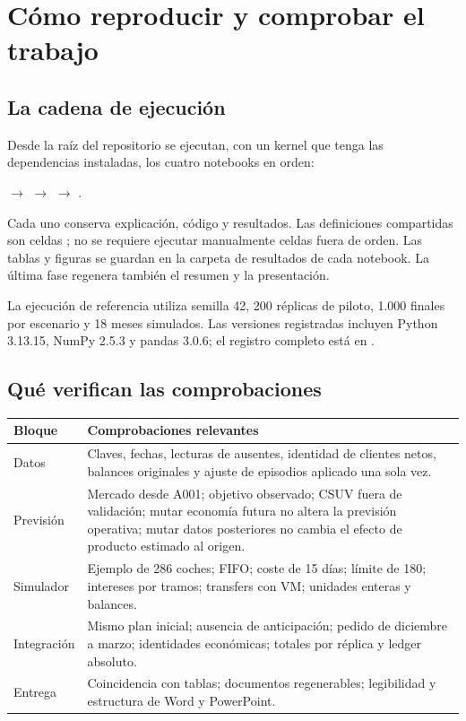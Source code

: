 \section{Cómo reproducir y comprobar el trabajo}\label{anexo:reproducir}

\subsection{La cadena de ejecución}
Desde la raíz del repositorio se ejecutan, con un kernel que tenga las dependencias
instaladas, los cuatro notebooks en orden:
\begin{center}
 $\longrightarrow$ 
$\longrightarrow$ 
$\longrightarrow$ .
\end{center}
Cada uno conserva explicación, código y resultados. Las definiciones compartidas
son celdas ; no se requiere ejecutar manualmente celdas fuera de orden.
Las tablas y figuras se guardan en la carpeta de resultados de cada notebook.
La última fase regenera también el resumen y la presentación.

La ejecución de referencia utiliza semilla 42, 200 réplicas de piloto, 1.000
finales por escenario y 18 meses simulados. Las versiones registradas incluyen
Python 3.13.15, NumPy 2.5.3 y pandas 3.0.6; el registro completo está en
.

\subsection{Qué verifican las comprobaciones}
\noindent\begin{tabularx}{\linewidth}{@{}p{3.1cm}Y@{}}\toprule
Bloque & Comprobaciones relevantes \\\midrule
Datos & Claves, fechas, lecturas de ausentes, identidad de clientes netos,
balances originales y ajuste de episodios aplicado una sola vez.\\
Previsión & Mercado desde A001; objetivo observado; CSUV fuera de validación;
mutar economía futura no altera la previsión operativa; mutar datos posteriores
no cambia el efecto de producto estimado al origen.\\
Simulador & Ejemplo de 286 coches; FIFO; coste de 15 días; límite de 180;
intereses por tramos; transfers con VM; unidades enteras y balances.\\
Integración & Mismo plan inicial; ausencia de anticipación; pedido de diciembre
a marzo; identidades económicas; totales por réplica y ledger absoluto.\\
Entrega & Coincidencia con tablas; documentos regenerables; legibilidad y
estructura de Word y PowerPoint.\\\bottomrule
\end{tabularx}

